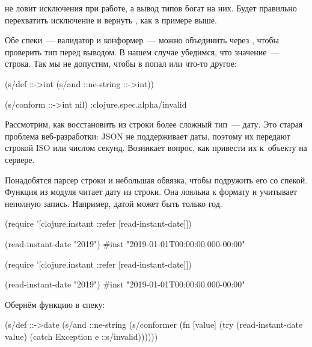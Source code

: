 
 не ловит исключения при работе, а вывод типов богат на
них. Будет правильно перехватить исключение и вернуть , как
в примере выше.

Обе спеки~--- валидатор и конформер~--- можно объединить через ,
чтобы проверить тип перед выводом. В нашем случае убедимся, что значение~---
строка. Так мы не допустим, чтобы в  попал  или
что-то другое:

\begin{clojure}
(s/def ::->int
  (s/and ::ne-string ::->int))

(s/conform ::->int nil)
:clojure.spec.alpha/invalid
\end{clojure}


Рассмотрим, как восстановить из строки более сложный тип~--- дату. Это старая
проблема веб-разработки: JSON не поддерживает даты, поэтому их передают строкой
ISO или числом секунд. Возникает вопрос, как привести их к~объекту на сервере.


Понадобятся парсер строки и небольшая обвязка, чтобы подружить его со
спекой. Функция  из модуля  читает
дату из строки. Она лояльна к формату и учитывает неполную запись. Например,
датой может быть только год.


\ifnarrow

\begin{clojure}
(require '[clojure.instant
           :refer [read-instant-date]])

(read-instant-date "2019")
#inst "2019-01-01T00:00:00.000-00:00"
\end{clojure}

\else

\begin{clojure}
(require '[clojure.instant :refer [read-instant-date]])

(read-instant-date "2019")
#inst "2019-01-01T00:00:00.000-00:00"
\end{clojure}

\fi

Обернём функцию в спеку:

\begin{clojure}
(s/def ::->date
  (s/and
   ::ne-string
   (s/conformer
    (fn [value]
      (try
        (read-instant-date value)
        (catch Exception e
          ::s/invalid))))))
\end{clojure}

